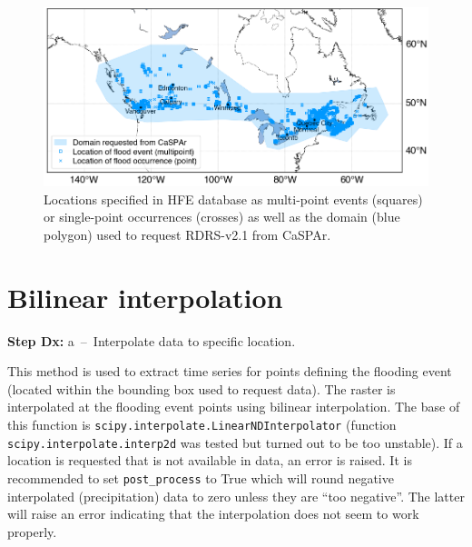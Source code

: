\documentclass[10pt,a4paper,titlepage,parskip]{scrartcl}
\begin{document}
\begin{figure}
	\centering
	\includegraphics[width=0.8\linewidth]{figures/test-all-coordinates-in-hfe.png}
	\caption{Locations specified in HFE database as multi-point events (squares) or single-point occurrences (crosses) as well as the domain (blue polygon) used to request RDRS-v2.1 from CaSPAr.}
	\label{fig:plot_example:location_points}
\end{figure}

\clearpage

\section{Bilinear interpolation}

\textbf{Step Dx:} a~--~Interpolate data to specific location.

This method is used to extract time series for points defining the flooding event (located within the bounding box used to request data). The raster is interpolated at the flooding event points using bilinear interpolation. The base of this function is \texttt{scipy.interpolate.LinearNDInterpolator} (function \texttt{scipy.interpolate.interp2d} was tested but turned out to be too unstable). If a location is requested that is not available in data, an error is raised. It is recommended to set \texttt{post\_process} to True which will round negative interpolated (precipitation) data to zero unless they are ``too negative''. The latter will raise an error indicating that the interpolation does not seem to work properly.
\end{document}
